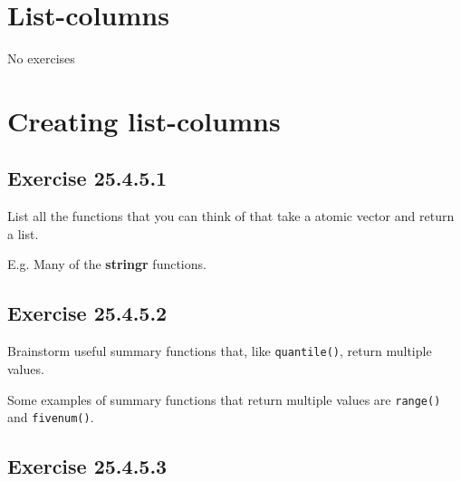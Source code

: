 \documentclass[]{book}
\newenvironment{Shaded}{\begin{snugshade}}{\end{snugshade}}
\newcommand{\CommentTok}[1]{\textcolor[rgb]{0.56,0.35,0.01}{\textit{#1}}}
\newcommand{\KeywordTok}[1]{\textcolor[rgb]{0.13,0.29,0.53}{\textbf{#1}}}
\newcommand{\NormalTok}[1]{#1}
\newcommand{\OperatorTok}[1]{\textcolor[rgb]{0.81,0.36,0.00}{\textbf{#1}}}
\theoremstyle{plain}
\theoremstyle{remark}
\begin{document}
\hypertarget{list-columns}{%
\section{List-columns}\label{list-columns}}

No exercises

\hypertarget{creating-list-columns}{%
\section{Creating list-columns}\label{creating-list-columns}}

\hypertarget{exercise-25.4.5.1}{%
\subsection*{\texorpdfstring{Exercise {25.4.5.1}}{Exercise 25.4.5.1}}\label{exercise-25.4.5.1}}

List all the functions that you can think of that take a atomic vector and return a list.

E.g. Many of the \textbf{stringr} functions.

\hypertarget{exercise-25.4.5.2}{%
\subsection*{\texorpdfstring{Exercise {25.4.5.2}}{Exercise 25.4.5.2}}\label{exercise-25.4.5.2}}

Brainstorm useful summary functions that, like \texttt{quantile()}, return multiple values.

Some examples of summary functions that return multiple values are \texttt{range()} and \texttt{fivenum()}.

\begin{Shaded}
\end{Shaded}

\hypertarget{exercise-25.4.5.3}{%
\subsection*{\texorpdfstring{Exercise {25.4.5.3}}{Exercise 25.4.5.3}}\label{exercise-25.4.5.3}}
\end{document}
